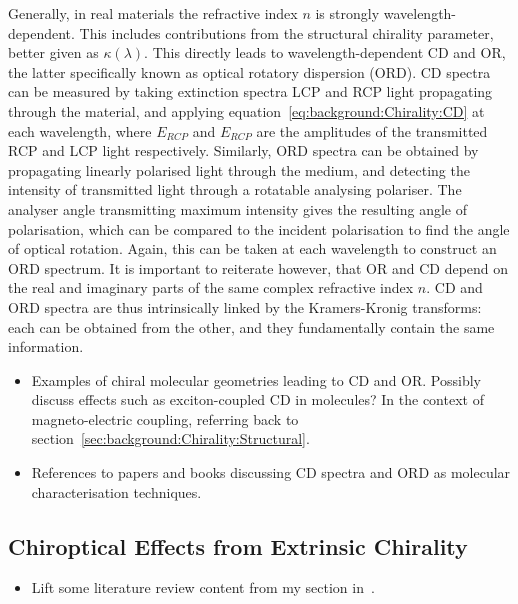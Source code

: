 Generally, in real materials the refractive index $n$ is strongly wavelength-dependent. This includes contributions from the structural chirality parameter, better given as $\kappa(\lambda)$. This directly leads to wavelength-dependent CD and OR, the latter specifically known as optical rotatory dispersion (ORD). CD spectra can be measured by taking extinction spectra LCP and RCP light propagating through the material, and applying equation~\ref{eq:background:Chirality:CD} at each wavelength, where $E_{RCP}$ and $E_{RCP}$ are the amplitudes of the transmitted RCP and LCP light respectively. Similarly, ORD spectra can be obtained by propagating linearly polarised light through the medium, and detecting the intensity of transmitted light through a rotatable analysing polariser. The analyser angle transmitting maximum intensity gives the resulting angle of polarisation, which can be compared to the incident polarisation to find the angle of optical rotation. Again, this can be taken at each wavelength to construct an ORD spectrum. It is important to reiterate however, that OR and CD depend on the real and imaginary parts of the same complex refractive index $n$. CD and ORD spectra are thus intrinsically linked by the Kramers-Kronig transforms: each can be obtained from the other, and they fundamentally contain the same information. 

\begin{itemize}
    \item Examples of chiral molecular geometries leading to CD and OR. Possibly discuss effects such as exciton-coupled CD in molecules? In the context of magneto-electric coupling, referring back to section~\ref{sec:background:Chirality:Structural}.
    \item References to papers and books discussing CD spectra and ORD as molecular characterisation techniques.
\end{itemize}



\subsection{Chiroptical Effects from Extrinsic Chirality}\label{sec:background:Chirality:extrinsic}
\begin{itemize}
    \item Lift some literature review content from my section in~\cite{Collins2017}.
\end{itemize}

